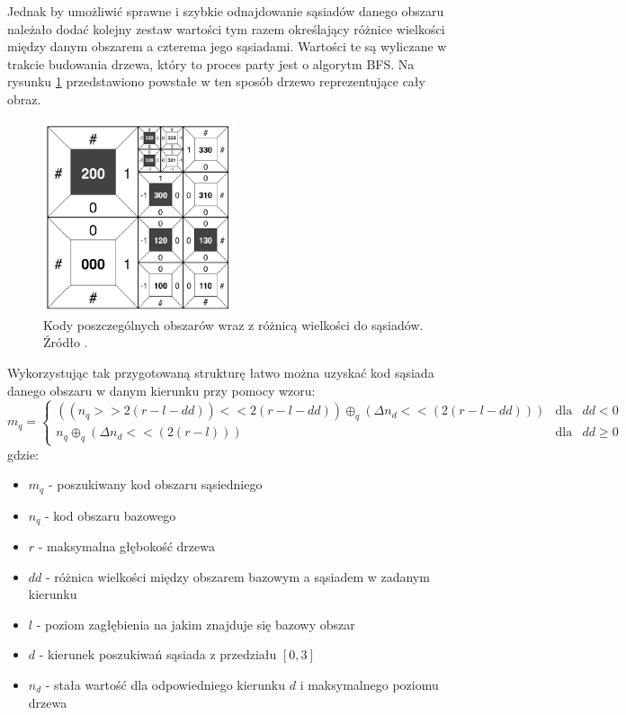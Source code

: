 \documentclass{classrep}
\begin{document}
Jednak by umożliwić sprawne i szybkie odnajdowanie sąsiadów danego obszaru należało dodać kolejny zestaw wartości tym razem określający różnice wielkości między danym obszarem a czterema jego sąsiadami. Wartości te są wyliczane w trakcie budowania drzewa, który to proces party jest o algorytm BFS. Na rysunku \ref{fig_seg_kody2} przedstawiono powstałe w ten sposób drzewo reprezentujące cały obraz.

\begin{figure}[H]
  \centering
  \includegraphics[width=0.5\textwidth]{img/seg/kody2}
  \caption{Kody poszczególnych obszarów wraz z różnicą wielkości do sąsiadów. Źródło \cite{3}.}
  \label{fig_seg_kody2}
\end{figure}

Wykorzystując tak przygotowaną strukturę łatwo można uzyskać kod sąsiada danego obszaru w danym kierunku przy pomocy wzoru:
\begin{equation}
\label{eq:seg_nei}
m_{q}=\left\{
\begin{array}{lcc}
((n_{q}>>2(r-l-dd))<<2(r-l-dd))\oplus_{q}(\Delta n_{d}<<(2(r-l-dd)))&\mbox{dla}&dd<0\\
n_{q}\oplus_{q}(\Delta n_{d}<<(2(r-l)))&\mbox{dla}&dd\ge 0
\end{array}
\right.
\end{equation}
gdzie:
\begin{itemize}
\item $m_{q}$ - poszukiwany kod obszaru sąsiedniego
\item $n_{q}$ - kod obszaru bazowego
\item $r$ - maksymalna głębokość drzewa
\item $dd$ - różnica wielkości między obszarem bazowym a sąsiadem w zadanym kierunku
\item $l$ - poziom zagłębienia na jakim znajduje się bazowy obszar
\item $d$ - kierunek poszukiwań sąsiada z przedziału $[0,3]$
\item $n_{d}$ - stała wartość dla odpowiedniego kierunku $d$ i maksymalnego poziomu drzewa
\end{itemize}
\end{document}
